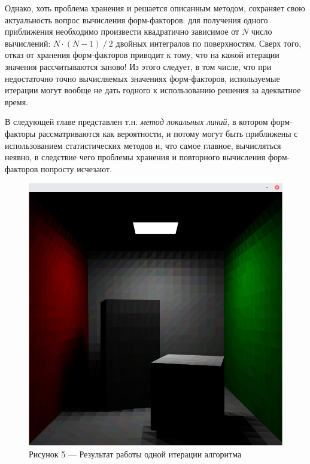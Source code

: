 \documentclass[12pt]{article}
\begin{document}
Однако, хоть проблема хранения и решается описанным методом, сохраняет свою актуальность вопрос вычисления форм-факторов: для получения одного приближения необходимо произвести квадратично зависимое от $N$ число вычислений: $N \cdot (N - 1)~/~2$ двойных интегралов по поверхностям. Сверх того, отказ от хранения форм-факторов приводит к тому, что на кажой итерации значения рассчитываются заново! Из этого следует, в том числе, что при недостаточно точно вычисляемых значениях форм-факторов, используемые итерации могут вообще не дать годного к использованию решения за адекватное время.

В следующей главе представлен т.н. \emph{метод локальных линий}, в котором форм-факторы рассматриваются как вероятности, и потому могут быть приближены с использованием статистических методов и, что самое главное, вычисляться неявно, в следствие чего проблемы хранения и повторного вычисления форм-факторов попросту исчезают. 


\begin{figure}[h]
\centering
\includegraphics[scale=0.3]{direct_only.png}
\caption*{Рисунок 5 --- Результат работы одной итерации алгоритма}
\end{figure}
\end{document}
